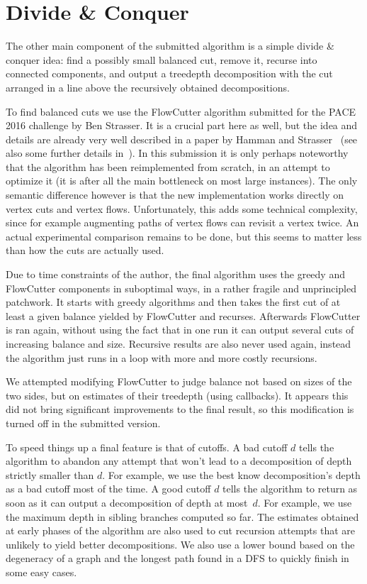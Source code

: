 \documentclass{timgad}
\begin{document}
\section{Divide \& Conquer}
The other main component of the submitted algorithm is a simple divide \& conquer idea: find a possibly small balanced cut, remove it, recurse into connected components, and output a treedepth decomposition with the cut arranged in a line above the recursively obtained decompositions.

To find balanced cuts we use the FlowCutter algorithm submitted for the PACE 2016 challenge by Ben Strasser.
It is a crucial part here as well, but the idea and details are already very well described in a paper by Hamman and Strasser~\cite{HamannS18} (see also some further details in~\cite{Strasser17}).
In this submission it is only perhaps noteworthy that the algorithm has been reimplemented from scratch,
in an attempt to optimize it (it is after all the main bottleneck on most large instances).
The only semantic difference however is that the new implementation works directly on vertex cuts and vertex flows.
Unfortunately, this adds some technical complexity, since for example augmenting paths of vertex flows can revisit a vertex twice.
An actual experimental comparison remains to be done, but this seems to matter less than how the cuts are actually used.

Due to time constraints of the author, the final algorithm uses the greedy and FlowCutter components in suboptimal ways, in a rather fragile and unprincipled patchwork.
It starts with greedy algorithms and then takes the first cut of at least a given balance yielded by FlowCutter and recurses.
Afterwards FlowCutter is ran again, without using the fact that in one run it can output several cuts of increasing balance and size.
Recursive results are also never used again, instead the algorithm just runs in a loop with more and more costly recursions.

We attempted modifying FlowCutter to judge balance not based on sizes of the two sides, but on estimates of their treedepth (using callbacks).
It appears this did not bring significant improvements to the final result, so this modification is turned off in the submitted version.

To speed things up a final feature is that of cutoffs.
A bad cutoff $d$ tells the algorithm to abandon any attempt that won't lead to a decomposition of depth strictly smaller than $d$.
For example, we use the best know decomposition's depth as a bad cutoff most of the time.
A good cutoff $d$ tells the algorithm to return as soon as it can output a decomposition of depth at most~$d$.
For example, we use the maximum depth in sibling branches computed so far.
The estimates obtained at early phases of the algorithm are also used to cut recursion attempts that are unlikely to yield better decompositions.
We also use a lower bound based on the degeneracy of a graph and the longest path found in a DFS to quickly finish in some easy cases.
\end{document}
